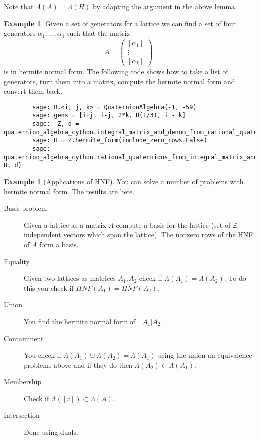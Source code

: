 \documentclass[10pt]{article}
\theoremstyle{plain}
\theoremstyle{definition}
\newtheorem{example}[theorem]{Example}
\newcommand{\Z}{\mathbb{Z}}
\begin{document}
Note that \( \Lambda(A) = \Lambda(H) \) by adapting the argument in the above lemma.



\begin{example}
    Given a set of generators for a lattice we can find a set of four generators \( \alpha_1, \dots , \alpha_4 \) such that the matrix
    \[
        A =
        \begin{pmatrix}
            [\alpha_1] \\  \vdots \\ [\alpha_k]
        \end{pmatrix}.
    \]
    is in hermite normal form.
    The following code shows how to take a list of generators, turn them into a matrix, compute the hermite normal form and convert them back.
    \begin{lstlisting}
        sage: B.<i, j, k> = QuaternionAlgebra(-1, -59)
        sage: gens = [i+j, i-j, 2*k, B(1/3), i - k]
        sage:  Z, d = quaternion_algebra_cython.integral_matrix_and_denom_from_rational_quaternions(gens)
        sage: H = Z.hermite_form(include_zero_rows=False)
        sage: quaternion_algebra_cython.rational_quaternions_from_integral_matrix_and_denom(B, H, d)
  \end{lstlisting}
\end{example}

\begin{example}[Applications of HNF]
    You can solve a number of problems with hermite normal form. The results are \href{https://cseweb.ucsd.edu/classes/sp14/cse206A-a/}{here}.
    \begin{description}
        \item[Basis problem] Given a lattice as a matrix \( A \) compute a basis for the lattice (set of \( \Z \)-independent vectors which span the lattice).
        The nonzero rows of the HNF of \( A \) form a basis.
        \item [Equality] Given two lattices as matrices \( A_1, A_2 \) check if \( \Lambda(A_1) = \Lambda(A_2) \).
        To do this you check if \( HNF(A_1) = HNF(A_2) \).
        \item [Union] You find the hermite normal form of \( [A_1 | A_2] \).
        \item [Containment] You check if \( \Lambda(A_1) \cup \Lambda(A_2)  = \Lambda(A_1)\) using the union an equivalence problems above and if they do then \( \Lambda(A_2) \subset \Lambda(A_1) \).
        \item [Membership] Check if \( \Lambda([v]) \subset \Lambda(A) \).
        \item [Intersection] Done using duals.
    \end{description}
\end{example}
\end{document}
